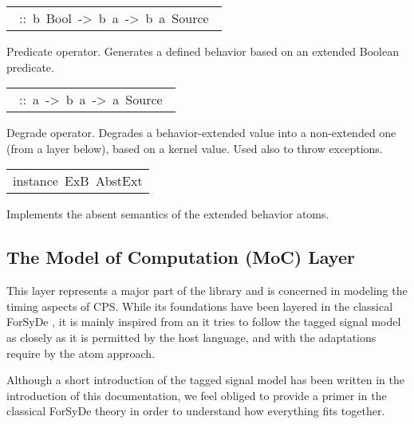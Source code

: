 \begin{haddockdesc}
\begin{haddockdesc}
\item[\begin{tabular}{@{}l}\haddockid{(/\&\textbackslash)}\ ::\ b\ Bool\ ->\ b\ a\ ->\ b\ a\ Source\ \end{tabular}]
\haddockbegindoc
Predicate operator. Generates a defined behavior based on an extended Boolean predicate.\par

\item[\begin{tabular}{@{}l}\haddockid{(/"!\textbackslash)}\ ::\ a\ ->\ b\ a\ ->\ a\ Source\ \end{tabular}]
\haddockbegindoc
Degrade operator. Degrades a behavior-extended value into a non-extended one (from a layer below), based on a kernel value. Used also to throw exceptions.\par

\end{haddockdesc}


\item[\begin{tabular}{@{}l}
instance\ ExB\ AbstExt
\end{tabular}]\haddockbegindoc
Implements the absent semantics of the extended behavior atoms.\par

\end{haddockdesc}
\subsection{The Model of Computation (MoC) Layer}
This layer represents a major part of the 
 library and is concerned in modeling the timing aspects of
 CPS. While its foundations have been layered in the classical
 ForSyDe \cite{Sander04}, it is mainly inspired from
 \cite{Lee98} an it tries to follow the tagged signal model as
 closely as it is permitted by the host language, and with the
 adaptations require by the atom approach.\par
Although a short introduction of the tagged signal model has been
 written in the introduction of this documentation, we feel
 obliged to provide a primer in the classical ForSyDe theory in
 order to understand how everything fits together.\par

